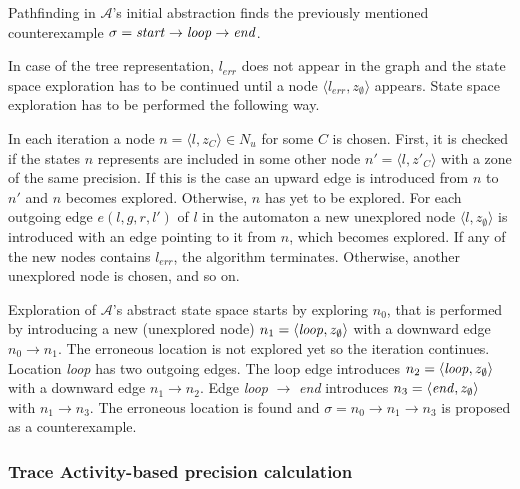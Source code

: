 \begin{runningExample}
	Pathfinding in $\mathcal{A}$'s initial abstraction finds the previously mentioned counterexample $\sigma= \text{\emph{start}} \to \text{\emph{loop}} \to \text{\emph{end}}$.
\end{runningExample}

In case of the tree representation, $l_{err}$ does not appear in the graph and the state space exploration has to be continued until a node $\langle l_{err}, z_{\emptyset} \rangle$ appears. State space exploration has to be performed the following way.

In each iteration a node $n=\langle l, z_{C} \rangle \in N_u$ for some $C$ is chosen. First, it is checked if the states $n$ represents are included in some other node $n'=\langle l, z'_{C} \rangle$ with a zone of the same precision. If this is the case an upward edge is introduced from $n$ to $n'$ and $n$ becomes explored. Otherwise, $n$ has yet to be explored. For each outgoing edge $e(l,g,r,l')$ of $l$ in the automaton a new unexplored node $\langle l, z_{\emptyset} \rangle$ is introduced with an edge pointing to it from $n$, which becomes explored. If any of the new nodes contains $l_{err}$, the algorithm terminates. Otherwise, another unexplored node is chosen, and so on.

\begin{runningExample}
	Exploration of $\mathcal{A}$'s abstract state space starts by exploring $n_0$, that is performed by introducing a new (unexplored node) $n_1=\langle \text{\emph{loop}}, z_\emptyset \rangle$ with a downward edge $n_0 \to n_1$. The erroneous location is not explored yet so the iteration continues. Location \emph{loop} has two outgoing edges. The loop edge introduces $n_2=\langle \text{\emph{loop}}, z_\emptyset \rangle$ with a downward edge $n_1 \to n_2$. Edge \emph{loop} $\to$ \emph{end} introduces $n_3=\langle \text{\emph{end}}, z_\emptyset \rangle$ with $n_1 \to n_3$. The erroneous location is found and $\sigma= n_0 \to n_1 \to n_3$ is proposed as a counterexample.
\end{runningExample}


\subsubsection{Trace Activity-based precision calculation}

